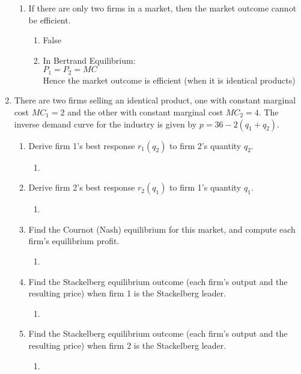 \documentclass[11pt]{article}
\begin{document}
\begin{enumerate}
\begin{enumerate}
	\item If there are only two firms in a market, then the market outcome cannot be efficient.
    \begin{enumerate}
        \item False
        \item In Bertrand Equilibrium:\\
        $P_1 = P_2 = MC$\\
        Hence the market outcome is efficient (when it is identical products)
    \end{enumerate}
    
	\end{enumerate}
    
    
\item There are two firms selling an identical product, one with constant marginal cost $MC_{1}=2$ and the other with constant marginal cost $MC_{2}=4$. The inverse demand curve for the industry is given by $p=36-2(q_{1}+q_{2})$.
    \begin{enumerate}
        \item Derive firm 1's best response $r_{1}(q_{2})$ to firm 2's quantity $q_{2}$.
        \begin{enumerate}
            \item 
        \end{enumerate}

        \item Derive firm 2's best response $r_{2}(q_{1})$ to firm 1's quantity $q_{1}$.
        \begin{enumerate}
            \item 
        \end{enumerate}
        \item Find the Cournot (Nash) equilibrium for this market, and compute each firm's equilibrium profit.
        \begin{enumerate}
            \item 
        \end{enumerate}
        
        \item Find the Stackelberg equilibrium outcome (each firm's output and the resulting price) when firm 1 is the Stackelberg leader.
        \begin{enumerate}
            \item 
        \end{enumerate}
        
        \item Find the Stackelberg equilibrium outcome (each firm's output and the resulting price) when firm 2 is the Stackelberg leader.
        \begin{enumerate}
            \item 
        \end{enumerate}
    \end{enumerate}


\end{enumerate}
\end{document}
